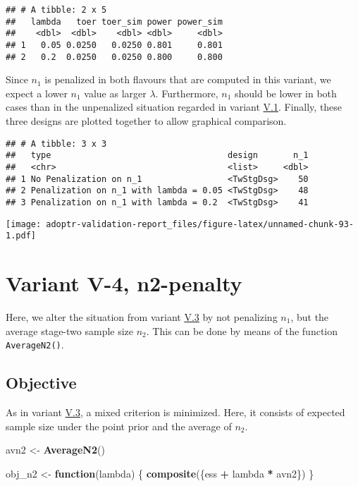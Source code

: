 \documentclass[]{book}
\newenvironment{Shaded}{\begin{snugshade}}{\end{snugshade}}
\newcommand{\ControlFlowTok}[1]{\textcolor[rgb]{0.13,0.29,0.53}{\textbf{#1}}}
\newcommand{\KeywordTok}[1]{\textcolor[rgb]{0.13,0.29,0.53}{\textbf{#1}}}
\newcommand{\NormalTok}[1]{#1}
\newcommand{\OperatorTok}[1]{\textcolor[rgb]{0.81,0.36,0.00}{\textbf{#1}}}
\newcommand{\StringTok}[1]{\textcolor[rgb]{0.31,0.60,0.02}{#1}}
\begin{document}
\begin{verbatim}
## # A tibble: 2 x 5
##   lambda   toer toer_sim power power_sim
##    <dbl>  <dbl>    <dbl> <dbl>     <dbl>
## 1   0.05 0.0250   0.0250 0.801     0.801
## 2   0.2  0.0250   0.0250 0.800     0.800
\end{verbatim}

Since \(n_1\) is penalized in both flavours that are computed in this variant,
we expect a lower \(n_1\) value as larger \(\lambda\).
Furthermore, \(n_1\) should be lower in both cases than in the unpenalized
situation regarded in variant \protect\hyperlink{variantV_1}{V.1}.
Finally, these three designs are plotted together to allow graphical comparison.

\begin{verbatim}
## # A tibble: 3 x 3
##   type                                   design       n_1
##   <chr>                                  <list>     <dbl>
## 1 No Penalization on n_1                 <TwStgDsg>    50
## 2 Penalization on n_1 with lambda = 0.05 <TwStgDsg>    48
## 3 Penalization on n_1 with lambda = 0.2  <TwStgDsg>    41
\end{verbatim}

\texttt{[image: adoptr-validation-report\_files/figure-latex/unnamed-chunk-93-1.pdf]}

\hypertarget{variantV_4}{%
\section{Variant V-4, n2-penalty}\label{variantV_4}}

Here, we alter the situation from variant \protect\hyperlink{variantV_3}{V.3} by not penalizing
\(n_1\), but the average stage-two sample size \(n_2\).
This can be done by means of the function \texttt{AverageN2()}.

\hypertarget{objective-13}{%
\subsection{Objective}\label{objective-13}}

As in variant \protect\hyperlink{variantV_3}{V.3}, a mixed criterion is minimized.
Here, it consists of expected sample size under the point prior and the
average of \(n_2\).

\begin{Shaded}
\begin{Highlighting}[]
\NormalTok{avn2 <-}\StringTok{ }\KeywordTok{AverageN2}\NormalTok{()}

\NormalTok{obj_n2 <-}\StringTok{ }\ControlFlowTok{function}\NormalTok{(lambda) \{}
  \KeywordTok{composite}\NormalTok{(\{ess }\OperatorTok{+}\StringTok{ }\NormalTok{lambda }\OperatorTok{*}\StringTok{ }\NormalTok{avn2\})}
\NormalTok{\}}
\end{Highlighting}
\end{Shaded}
\end{document}
